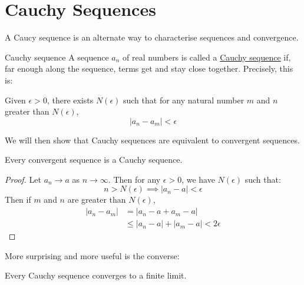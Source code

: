 \documentclass[../Main.tex]{subfiles}
\begin{document}
\section{Cauchy Sequences}
A Caucy sequence is an alternate way to characterise sequences and convergence.
\begin{definition}{Cauchy sequence}
    A sequence $a_n$ of real numbers is called a \underline{Cauchy sequence} if, far enough along the sequence, terms get and stay close together. Precisely, this is:\par
    Given $\epsilon > 0$, there exists $N(\epsilon)$ such that for any natural number $m$ and $n$ greater than $N(\epsilon)$,
    \begin{equation*}
        |a_n - a_m| < \epsilon
    \end{equation*}
\end{definition}
We will then show that Cauchy sequences are equivalent to convergent sequences.
\begin{lemma}
    Every convergent sequence is a Cauchy sequence.
    \label{lemConvergeImpliesCauchy}
\end{lemma}
\begin{proof}
    Let $a_n \to a$ as $n \to \infty$. Then for any $\epsilon > 0$, we have $N(\epsilon)$ such that:
    \begin{equation*}
        n > N(\epsilon) \implies |a_n - a| < \epsilon
    \end{equation*}
    Then if $m$ and $n$ are greater than $N(\epsilon)$,
    \begin{align*}
        |a_n - a_m| &= |a_n - a + a_m - a| \\
        &\leq |a_n - a| + |a_m - a| < 2\epsilon
    \end{align*}
\end{proof}
More surprising and more useful is the converse:
\begin{theorem}
    Every Cauchy sequence converges to a finite limit.
    \label{thmCauchyImpliesConverge}
\end{theorem}
\end{document}
